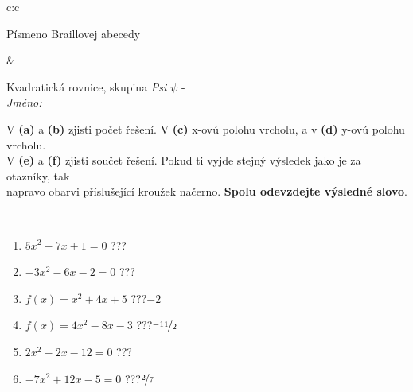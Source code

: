 \documentclass[10pt]{report}
\begin{document}
\begin{tabular}{c:c}
\begin{minipage}[c][104.5mm][t]{0.5\linewidth}
\begin{center}
\begin{minipage}{0.20\linewidth}
\begin{center}
{\small Písmeno Braillovej abecedy}
\end{center}
\end{minipage}
\end{center}
\end{minipage}
&
\begin{minipage}[c][104.5mm][t]{0.5\linewidth}
\begin{center}
\vspace{7mm}
{\huge Kvadratická rovnice, skupina \textit{Psi $\psi$} -}\\[5mm]
\textit{Jméno:}\phantom{xxxxxxxxxxxxxxxxxxxxxxxxxxxxxxxxxxxxxxxxxxxxxxxxxxxxxxxxxxxxxxxxx}\\[5mm]
\begin{minipage}{0.95\linewidth}
\begin{center}
V \textbf{(a)} a \textbf{(b)} zjisti počet řešení. V \textbf{(c)} x-ovú polohu vrcholu, a v \textbf{(d)} y-ovú polohu vrcholu.\\V \textbf{(e)} a \textbf{(f)} zjisti součet řešení. Pokud ti vyjde stejný výsledek jako je za otazníky, tak\\napravo obarvi příslušející kroužek načerno. \textbf{Spolu odevzdejte výsledné slovo}.
\end{center}
\end{minipage}
\\[1mm]
\begin{minipage}{0.79\linewidth}
\begin{center}
\begin{varwidth}{\linewidth}
\begin{enumerate}
\Large
\item $5x^2-7x+1=0$\quad \dotfill\; ???\;\dotfill {}
\item $-3x^2-6x-2=0$\quad \dotfill\; ???\;\dotfill {}
\item $f(x)=x^2+4x+5$\quad \dotfill\; ???\;\dotfill \quad $-2$
\item $f(x)=4x^2-8x-3$\quad \dotfill\; ???\;\dotfill \quad $\nicefrac{-11}{2}$
\item $2x^2-2x-12=0$\quad \dotfill\; ???\;\dotfill {}
\item $-7x^2+12x-5=0$\quad \dotfill\; ???\;\dotfill \quad $\nicefrac{2}{7}$
\end{enumerate}
\end{varwidth}
\end{center}
\end{minipage}
\begin{minipage}{0.20\linewidth}
\begin{center}

\end{center}
\end{minipage}
\end{center}
\end{minipage}
\end{tabular}
\end{document}

